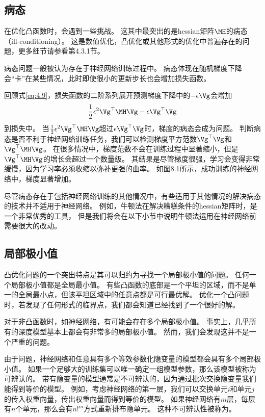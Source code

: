 \subsection{病态}
\label{sec:ill_conditioning}
在优化凸函数时，会遇到一些挑战。
这其中最突出的是\gls{hessian}矩阵$\MH$的病态（ill-conditioning）。
这是数值优化，凸优化或其他形式的优化中普遍存在的问题，更多细节请参看第4.3.1节。

病态问题一般被认为存在于神经网络训练过程中。
病态体现在随机梯度下降会“卡”在某些情况，此时即使很小的更新步长也会增加损失函数。

回顾式\ref{eq:4.9}，损失函数的二阶系列展开预测梯度下降中的$-\epsilon\Vg$会增加
\begin{equation}
    \frac{1}{2} \epsilon^2 \Vg^\top \MH\Vg - \epsilon\Vg^\top\Vg
\end{equation}
到损失中。
当$\frac{1}{2} \epsilon^2 \Vg^\top\MH\Vg$超过$\epsilon\Vg^\top\Vg$时，梯度的病态会成为问题。
判断病态是否不利于神经网络训练任务，我们可以检测梯度平方范数$\Vg^\top\Vg$和$\Vg^\top \MH\Vg$。
在很多情况中，梯度范数不会在训练过程中显著缩小，但是$\Vg^\top\MH\Vg$的增长会超过一个数量级。
其结果是尽管梯度很强，学习会变得非常缓慢，因为学习率必须收缩以弥补更强的曲率。
如图8.1所示，成功训练的神经网络中，梯度显著增加。


尽管病态存在于包括神经网络训练的其他情况中，有些适用于其他情况的解决病态的技术并不适用于神经网络。
例如，牛顿法在解决糟糕条件的\gls{hessian}矩阵时，是一个非常优秀的工具，
但是我们将会在以下小节中说明牛顿法运用在神经网络前需要很大的改动。

\subsection{局部极小值}
\label{sec:local_minima}
凸优化问题的一个突出特点是其可以归约为寻找一个局部极小值的问题。
任何一个局部极小值都是全局最小值。
有些凸函数的底部是一个平坦的区域，而不是单一的全局最小点，但该平坦区域中的任意点都是可行最优解。
优化一个凸问题时，若发现了任何形式的临界点，我们都会知道已经找到了一个很好的解。


对于非凸函数时，如神经网络，有可能会存在多个局部极小值。
事实上，几乎所有的深度模型基本上都会有非常多的局部极小值。
然而，我们会发现这并不是一个严重的问题。

由于问题，神经网络和任意具有多个等效参数化隐变量的模型都会具有多个局部极小值。
如果一个足够大的训练集可以唯一确定一组模型参数，那么该模型被称为可辨认的。
带有隐变量的模型通常是不可辨认的，因为通过批次交换隐变量我们能得到等价的模型。
例如，考虑神经网络的第一层，我们可以交换单元$i$和单元$j$的传入权重向量，传出权重向量而得到等价的模型。
如果神经网络有$m$层，每层有$n$个单元，那么会有$n!^m$方式重新排布隐单元。
这种不可辨认性被称为。

